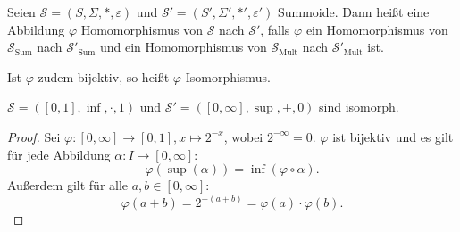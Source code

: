 \documentclass{article}
\begin{document}
\begin{definition}
  Seien $\mathcal{S} = (S, \Sigma, \ast, \varepsilon)$ und $\mathcal{S}' = (S', \Sigma', \ast', \varepsilon')$ Summoide.
  Dann heißt eine Abbildung $\varphi$ Homomorphismus von $\mathcal{S}$ nach $\mathcal{S}'$, falls
  $\varphi$ ein Homomorphismus von $\mathcal{S}_\text{Sum}$ nach $\mathcal{S}'_\text{Sum}$ und 
  ein Homomorphismus von $\mathcal{S}_\text{Mult}$ nach $\mathcal{S}'_\text{Mult}$ ist.

  Ist $\varphi$ zudem bijektiv, so heißt $\varphi$ Isomorphismus.
\end{definition}

\begin{theorem}
  $\mathcal{S} = ([0, 1], \inf, \cdot, 1)$ und $\mathcal{S}' = ([0, \infty], \sup, +, 0)$ sind isomorph.
\end{theorem}
\begin{proof}
  Sei $\varphi \colon [0, \infty] \to [0, 1], x \mapsto 2^{-x}$, wobei $2^{-\infty} = 0$.
  $\varphi$ ist bijektiv und es gilt für jede Abbildung $\alpha \colon I \to [0, \infty]$:
  \begin{equation*}
    \varphi(\sup(\alpha))= \inf(\varphi \circ \alpha).
  \end{equation*}
  Außerdem gilt für alle $a, b \in [0, \infty]$:
  \begin{equation*}
    \varphi(a + b) = 2^{-(a+b)} = \varphi(a) \cdot \varphi(b).
  \end{equation*}
\end{proof}
\end{document}
